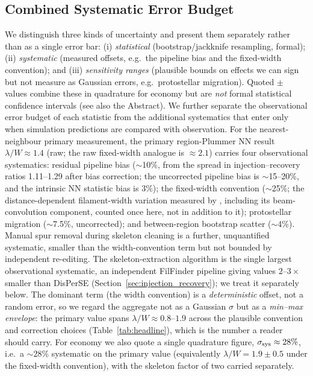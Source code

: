 \documentclass[usenatbib,twoside,twocolumn]{mnras}
\begin{document}
\subsection{Combined Systematic Error Budget}
\label{sec:error_budget}

We distinguish three kinds of uncertainty and present them separately rather than as a single error bar: (i) \emph{statistical} (bootstrap/jackknife resampling, formal); (ii) \emph{systematic} (measured offsets, e.g.\ the pipeline bias and the fixed-width convention); and (iii) \emph{sensitivity ranges} (plausible bounds on effects we can sign but not measure as Gaussian errors, e.g.\ protostellar migration). Quoted $\pm$ values combine these in quadrature for economy but are \emph{not} formal statistical confidence intervals (see also the Abstract). We further separate the observational error budget of each statistic from the additional systematics that enter only when simulation predictions are compared with observation. For the nearest-neighbour primary measurement, the primary region-Plummer NN result $\lambda/W\approx1.4$ (raw; the raw fixed-width analogue is $\approx2.1$) carries four observational systematics: residual pipeline bias ($\sim$10\%, from the spread in injection--recovery ratios 1.11--1.29 after bias correction; the uncorrected pipeline bias is $\sim$15--20\%, and the intrinsic NN statistic bias is 3\%); the fixed-width convention ($\sim$25\%; the distance-dependent filament-width variation measured by \citealt{Panopoulou2022}, including its beam-convolution component, counted once here, not in addition to it); protostellar migration ($\sim$7.5\%, uncorrected); and between-region bootstrap scatter ($\sim$4\%). Manual spur removal during skeleton cleaning is a further, unquantified systematic, smaller than the width-convention term but not bounded by independent re-editing. The skeleton-extraction algorithm is the single largest observational systematic, an independent FilFinder pipeline giving values $2$--$3\times$ smaller than DisPerSE (Section~\ref{sec:injection_recovery}); we treat it separately below. The dominant term (the width convention) is a \emph{deterministic} offset, not a random error, so we regard the aggregate not as a Gaussian $\sigma$ but as a \emph{min--max envelope}: the primary value spans $\lambda/W\approx0.8$--$1.9$ across the plausible convention and correction choices (Table~\ref{tab:headline}), which is the number a reader should carry. For economy we also quote a single quadrature figure, $\sigma_{\rm sys}\approx28\%$, i.e.\ a $\sim28\%$ systematic on the primary value (equivalently $\lambda/W=1.9\pm0.5$ under the fixed-width convention), with the skeleton factor of two carried separately.
\end{document}
